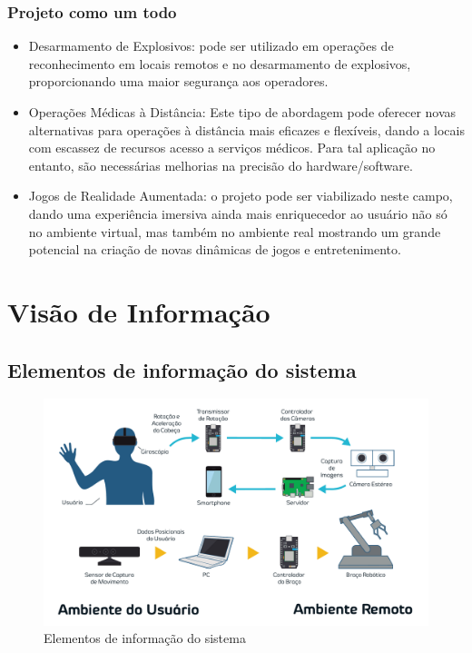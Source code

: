 	\subsubsection{Projeto como um todo}\label{subsubsec-all}
	\begin{itemize}
	\item Desarmamento de Explosivos: pode ser utilizado em operações de reconhecimento em locais remotos e no desarmamento de explosivos, proporcionando uma maior segurança aos operadores.

    \item Operações Médicas à Distância:  Este tipo de abordagem pode oferecer novas alternativas para operações à distância mais eficazes e flexíveis, dando a locais com escassez de recursos acesso a serviços médicos. Para tal aplicação no entanto, são necessárias melhorias na precisão do hardware/software.
    
	\item Jogos de Realidade Aumentada: o projeto pode ser viabilizado neste campo, dando uma experiência imersiva ainda mais enriquecedor ao usuário não só no ambiente virtual, mas também no ambiente real mostrando um grande potencial na criação de novas dinâmicas de jogos e entretenimento.
	\end{itemize}
	
	

	


	
	\section{Visão de Informação}\label{sec-info}
	\subsection{Elementos de informação do sistema}\label{subsec-elementos-info}
	
		\begin{figure}[h!]
		\caption{\label{fig_eleminfo}  Elementos de informação do sistema}
		\begin{center}
			\includegraphics[width=\textwidth]{eleminfo.pdf}	
		\end{center}
	\end{figure}
	
